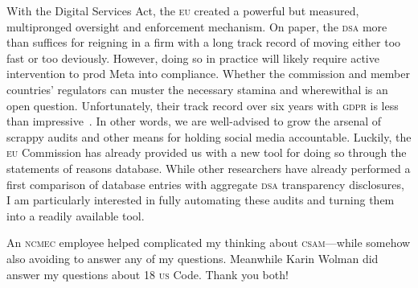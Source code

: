 \documentclass[nonacm,screen]{acmart}
\newcommand\V[1]{\textsc{\MakeLowercase{#1}}}
\begin{document}
With the Digital Services Act, the \V{EU} created a powerful but measured,
multipronged oversight and enforcement mechanism. On paper, the \V{DSA} more
than suffices for reigning in a firm with a long track record of moving either
too fast or too deviously. However, doing so in practice will likely require
active intervention to prod Meta into compliance. Whether the commission and
member countries' regulators can muster the necessary stamina and wherewithal is
an open question. Unfortunately, their track record over six years with \V{GDPR}
is less than impressive~\cite{Burgess2022}. In other words, we are well-advised
to grow the arsenal of scrappy audits and other means for holding social media
accountable. Luckily, the \V{EU} Commission has already provided us with a new
tool for doing so through the statements of reasons database. While other
researchers have already performed a first comparison of database entries with
aggregate \V{DSA} transparency disclosures, I am particularly interested in
fully automating these audits and turning them into a readily available tool.



\begin{acks}
An \V{NCMEC} employee helped complicated my thinking about \V{CSAM}---while
somehow also avoiding to answer any of my questions. Meanwhile Karin Wolman did
answer my questions about 18 \V{US} Code. Thank you both!
\end{acks}



\end{document}
